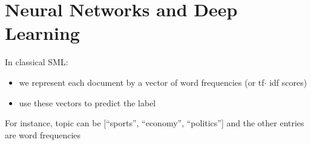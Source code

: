 \section{Neural Networks and Deep Learning}

\begin{frame}{In classical SML:}
\begin{itemize}[<+->]
\item we represent each document by a vector of word frequencies (or tf$\cdot$ idf scores)
\item use these vectors to predict the label
\end{itemize}
\end{frame}


\begin{frame}[plain]
        	\begin{table}[]
		\raggedright	
		For instance, topic can be [``sports'', ``economy'', ``politics''] and the other entries are word frequencies
	\end{table}
\end{frame}

